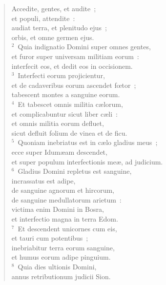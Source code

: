 \begin{flushleft}\begin{verse}\vspace{-19pt}\hspace{6pt}Accedite, gentes, et audite~;\\\hspace{6pt} et populi, attendite~:\\ audiat terra, et plenitudo ejus~;\\ orbis, et omne germen ejus.\\
${}^{2}$~Quia indignatio Domini super omnes gentes,\\ et furor super universam militiam eorum~:\\ interfecit eos, et dedit eos in occisionem.\\
${}^{3}$~Interfecti eorum projicientur,\\ et de cadaveribus eorum ascendet fœtor~;\\ tabescent montes a sanguine eorum.\\
${}^{4}$~Et tabescet omnis militia c\ae lorum,\\ et complicabuntur sicut liber c\ae li~:\\ et omnis militia eorum defluet,\\ sicut defluit folium de vinea et de ficu.\\
${}^{5}$~Quoniam inebriatus est in c\ae lo gladius meus~;\\ ecce super Idum\ae am descendet,\\ et super populum interfectionis me\ae , ad judicium.\\
${}^{6}$~Gladius Domini repletus est sanguine,\\ incrassatus est adipe,\\ de sanguine agnorum et hircorum,\\ de sanguine medullatorum arietum~:\\ victima enim Domini in Bosra,\\ et interfectio magna in terra Edom.\\
${}^{7}$~Et descendent unicornes cum eis,\\ et tauri cum potentibus~;\\ inebriabitur terra eorum sanguine,\\ et humus eorum adipe pinguium.\\
${}^{8}$~Quia dies ultionis Domini,\\ annus retributionum judicii Sion.\\

\end{verse}
\end{flushleft}
